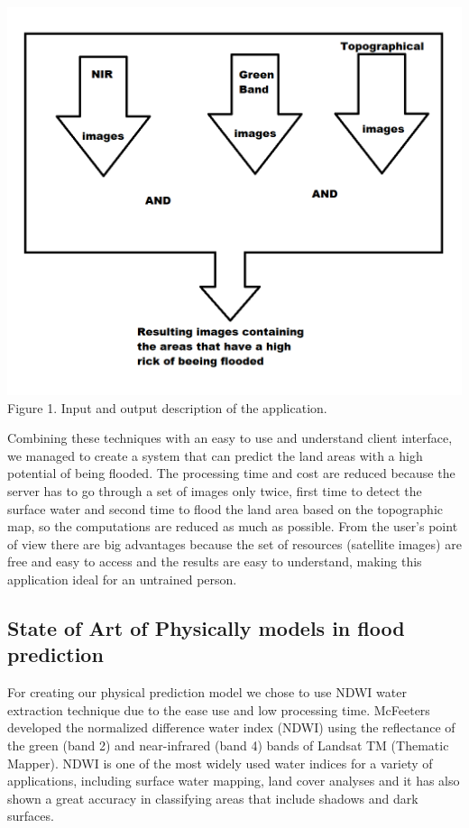 \documentclass[12pt, a4paper]{report}
\begin{document}
\begin{center}
	\includegraphics[scale=0.6]{application_outline.png} 
	Figure 1. Input and output description of the application.
\end{center}

Combining these techniques with an easy to use and understand client interface, we managed to create a system that can predict the land areas with a high potential of being flooded. The processing time and cost are reduced because the server has to go through a set of images only twice, first time to detect the surface water and second time to flood the land area based on the topographic map, so the computations are reduced as much as possible. From the user's point of view there are big advantages because the set of resources (satellite images) are free and easy to access and the results are easy to understand, making this application ideal for an untrained person.
\par





\subsection{State of Art of Physically models in flood prediction}

\quad
For creating our physical prediction model we chose to use NDWI water extraction technique due to the ease use and low processing time. McFeeters \cite{McFeeters} developed the normalized difference water index (NDWI) using the reflectance of the green (band 2) and near-infrared (band 4) bands of Landsat TM (Thematic Mapper). NDWI is one of the most widely used water indices for a variety of applications, including surface water mapping, land cover analyses \cite{Duan, Poulin, Hui} and it has also shown a great accuracy in classifying areas that include shadows and dark surfaces.
\par 
\end{document}
